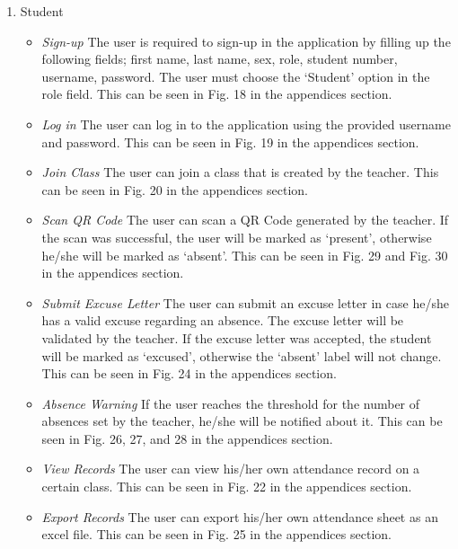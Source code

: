 \documentclass[journal]{./IEEE/IEEEtran}
\begin{document}
\begin{enumerate}
\begin{itemize}
    \end{itemize}
  \item[2.] Student
        \begin{itemize}
            \item \textit{Sign-up}
            \newline
            The user is required to sign-up in the application by filling up the following fields; first name, last name, sex, role, student number, username, password. The user must choose the ‘Student’ option in the role field. This can be seen in Fig. 18 in the appendices section.
            \item \textit{Log in}
            \newline
            The user can log in to the application using the provided username and password. This can be seen in Fig. 19 in the appendices section.
            \item \textit{Join Class}
            \newline
            The user can join a class that is created by the teacher. This can be seen in Fig. 20 in the appendices section.
            \item \textit{Scan QR Code}
            \newline
            The user can scan a QR Code generated by the teacher. If the scan was successful, the user will be marked as ‘present’, otherwise he/she will be marked as ‘absent’. This can be seen in Fig. 29 and Fig. 30 in the appendices section.
            \item \textit{Submit Excuse Letter}
            \newline
            The user can submit an excuse letter in case he/she has a valid excuse regarding an absence. The excuse letter will be validated by the teacher. If the excuse letter was accepted, the student will be marked as ‘excused’, otherwise the ‘absent’ label will not change. This can be seen in Fig. 24 in the appendices section.
            \item \textit{Absence Warning}
            \newline
            If the user reaches the threshold for the number of absences set by the teacher, he/she will be notified about it. This can be seen in Fig. 26, 27, and 28 in the appendices section.
            \item \textit{View Records} 
            \newline
            The user can view his/her own attendance record on a certain class. This can be seen in Fig. 22 in the appendices section.
            \item \textit{Export Records}
            \newline
            The user can export his/her own attendance sheet as an excel file. This can be seen in Fig. 25 in the appendices section.
            \newline
        \end{itemize}
        
\end{enumerate}
\end{document}
